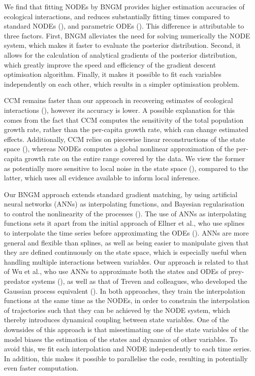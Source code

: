 \documentclass[11pt, oneside]{article}
\begin{document}
We find that fitting NODEs by BNGM provides higher estimation accuracies of ecological interactions, and reduces substantially fitting times compared to standard NODEs (\cite{Bonnaffe2021a}), and parametric ODEs (\cite{Rosenbaum2019}).
This difference is attributable to three factors.
First, BNGM alleviates the need for solving numerically the NODE system, which makes it faster to evaluate the posterior distribution.
Second, it allows for the calculation of analytical gradients of the posterior distribution, which greatly improve the speed and efficiency of the gradient descent optimisation algorithm.
Finally, it makes it possible to fit each variables independently on each other, which results in a simpler optimisation problem.

CCM remains faster than our approach in recovering estimates of ecological interactions (\cite{Sugihara2012}), however its accuracy is lower.
A possible explanation for this comes from the fact that CCM computes the sensitivity of the total population growth rate, rather than the per-capita growth rate, which can change estimated effects.
Additionally, CCM relies on piecewise linear reconstructions of the state space (\cite{Deyle2015}), whereas NODEs computes a global nonlinear approximation of the per-capita growth rate on the entire range covered by the data.
We view the former as potentially more sensitive to local noise in the state space (\cite{Cenci2019a}), compared to the latter, which uses all evidence available to inform local inference.

Our BNGM approach extends standard gradient matching, by using artificial neural networks (ANNs) as interpolating functions, and Bayesian regularisation to control the nonlinearity of the processes (\cite{Cawley2007}).
The use of ANNs as interpolating functions sets it apart from the initial approach of Ellner et al., who use splines to interpolate the time series before approximating the ODEs (\cite{Ellner2002}).
ANNs are more general and flexible than splines, as well as being easier to manipulate given that they are defined continuously on the state space, which is especially useful when handling multiple interactions between variables.
Our approach is related to that of Wu et al., who use ANNs to approximate both the states and ODEs of prey-predator systems (\cite{Wu2005}), as well as that of Treven and colleagues, who developed the Gaussian process equivalent (\cite{Treven2021}).
In both approaches, they train the interpolation functions at the same time as the NODEs, in order to constrain the interpolation of trajectories such that they can be achieved by the NODE system, which thereby introduces dynamical coupling between state variables.
One of the downsides of this approach is that misestimating one of the state variables of the model biases the estimation of the states and dynamics of other variables.
To avoid this, we fit each interpolation and NODE independently to each time series.
In addition, this makes it possible to parallelise the code, resulting in potentially even faster computation.
\end{document}
